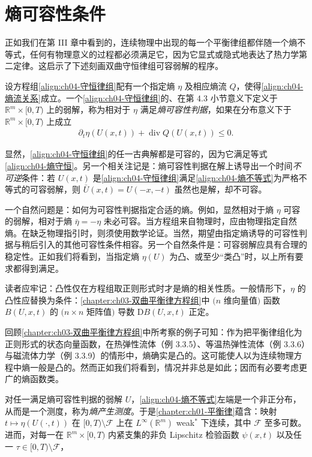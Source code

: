 \documentclass[../../main.tex]{subfiles}
\begin{document}
\section{熵可容性条件}\label{section:ch04-熵可容性条件}

正如我们在第 III 章中看到的，连续物理中出现的每一个平衡律组都伴随一个熵不等式，任何有物理意义的过程都必须满足它，因为它显式或隐式地表达了热力学第二定律。这启示了下述刻画双曲守恒律组可容弱解的程序。

设方程组\eqref{align:ch04-守恒律组}配有一个指定熵 $\eta$ 及相应熵流 $Q$，使得\eqref{align:ch04-熵流关系}成立。一个\eqref{align:ch04-守恒律组}的、在第 4.3 小节意义下定义于 $\mathbb{R}^{m}\times[0,T)$ 上的弱解，称为相对于 $\eta$ 满足\emph{熵可容性判据}，如果在分布意义下于 $\mathbb{R}^{m}\times[0,T)$ 上成立
\begin{align}
\partial_{t}\eta(U(x,t))+\operatorname{div}Q(U(x,t))\leqslant 0.
\label{align:ch04-熵不等式}
\end{align}

显然，\eqref{align:ch04-守恒律组}的任一古典解都是可容的，因为它满足等式\eqref{align:ch04-熵守恒}。另一个相关注记是：熵可容性判据在解上诱导出一个时间\emph{不可逆}条件：若 $U(x,t)$ 是\eqref{align:ch04-守恒律组}满足\eqref{align:ch04-熵不等式}为严格不等式的可容弱解，则 $\bar{U}(x,t)=U(-x,-t)$ 虽然也是解，却不可容。

一个自然问题是：如何为可容性判据指定合适的熵。例如，显然相对于熵 $\eta$ 可容的弱解，相对于熵 $\bar{\eta}=-\eta$ 未必可容。当方程组来自物理时，应由物理指定自然熵。在缺乏物理指引时，则须使用数学论证。当然，期望由指定熵诱导的可容性判据与稍后引入的其他可容性条件相容。另一个自然条件是：可容弱解应具有合理的稳定性。正如我们将看到，当指定熵 $\eta(U)$ 为凸、或至少“类凸”时，以上所有要求都得到满足。

读者应牢记：凸性仅在方程组取正则形式时才是熵的相关性质。一般情形下，$\eta$ 的凸性应替换为条件：\cref{chapter:ch03-双曲平衡律方程组}中 $(n$ 维向量值$)$ 函数 $B(U,x,t)$ 的 $(n\times n$ 矩阵值$)$ 导数 $\mathrm{D}B(U,x,t)$ 正定。


回顾\cref{chapter:ch03-双曲平衡律方程组}中所考察的例子可知：作为把平衡律组化为正则形式的状态向量函数，在热弹性流体（例 3.3.5）、等温热弹性流体（例 3.3.6）与磁流体力学（例 3.3.9）的情形中，熵确实是凸的。这可能使人以为连续物理方程中熵一般是凸的。然而正如我们将看到，情况并非总是如此；因而有必要考虑更广的熵函数类。


对任一满足熵可容性判据的弱解 $U$，\eqref{align:ch04-熵不等式}左端是一个非正分布，从而是一个测度，称为\emph{熵产生测度}。于是\cref{chapter:ch01-平衡律}蕴含：映射 $t\mapsto\eta(U(\cdot,t))$ 在 $[0,T)\setminus\mathscr{F}$ 上在 $L^{\infty}(\mathbb{R}^{m})$ weak$^{*}$ 下连续，其中 $\mathscr{F}$ 至多可数。进而，对每一在 $\mathbb{R}^{m}\times[0,T)$ 内紧支集的非负 Lipschitz 检验函数 $\psi(x,t)$ 以及任一 $\tau\in[0,T)\setminus\mathscr{F}$，
\end{document}
